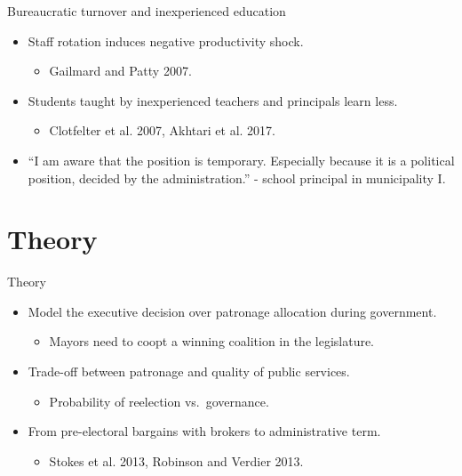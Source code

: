 \documentclass[ignorenonframetext,]{beamer}
\providecommand{\tightlist}{%
  \setlength{\itemsep}{0pt}\setlength{\parskip}{0pt}}
\newcommand{\source}{\footnotesize\textcolor{black!25}}
\begin{document}
\begin{frame}{Bureaucratic turnover and inexperienced education}
\protect\hypertarget{bureaucratic-turnover-and-inexperienced-education}{}

\begin{itemize}
\tightlist
\item
  Staff rotation induces negative productivity shock.

  \begin{itemize}
  \item
    \source{Gailmard and Patty 2007.}
  \end{itemize}
\item
  Students taught by inexperienced teachers and principals learn less.

  \begin{itemize}
  \item
    \source{Clotfelter et al. 2007, Akhtari et al. 2017.}
  \end{itemize}
\item
  ``I am aware that the position is temporary. Especially because it is
  a political position, decided by the administration.''
  \source{- school principal in municipality I.}
\end{itemize}

\end{frame}

\hypertarget{theory}{%
\section{Theory}\label{theory}}

\begin{frame}{Theory}
\protect\hypertarget{theory-1}{}

\begin{itemize}
\tightlist
\item
  Model the executive decision over patronage allocation during
  government.

  \begin{itemize}
  \tightlist
  \item
    Mayors need to coopt a winning coalition in the legislature.
  \end{itemize}
\item
  Trade-off between patronage and quality of public services.

  \begin{itemize}
  \tightlist
  \item
    Probability of reelection vs.~governance.
  \end{itemize}
\item
  From pre-electoral bargains with brokers to administrative term.

  \begin{itemize}
  \item
    \source{Stokes et al. 2013, Robinson and Verdier 2013.}
  \end{itemize}
\end{itemize}

\end{frame}
\end{document}
